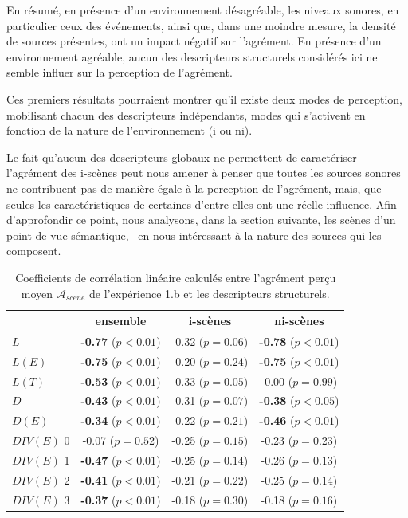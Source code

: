 En résumé, en présence d'un environnement désagréable, les niveaux sonores, en particulier ceux des événements, ainsi que, dans une moindre mesure, la densité de sources présentes, ont un impact négatif sur l'agrément. En présence d'un environnement agréable, aucun des descripteurs structurels considérés ici ne semble influer sur la perception de l'agrément. 

Ces premiers résultats pourraient montrer qu'il existe deux modes de perception, mobilisant chacun des descripteurs indépendants, modes qui s'activent en fonction de la nature de l'environnement (i ou ni).

Le fait qu'aucun des descripteurs globaux ne permettent de caractériser l'agrément des i-scènes peut nous amener à penser que toutes les sources sonores ne contribuent pas de manière égale à la perception de l'agrément, mais, que seules les caractéristiques de certaines d'entre elles ont une réelle influence. Afin d'approfondir ce point, nous analysons, dans la section suivante, les scènes d'un point de vue sémantique, \ie~en nous intéressant à la nature des sources qui les composent. \\


\begin{table}[t]
\centering
\begin{tabular}{l c c c} 
               & ensemble                     & i-scènes                   & ni-scènes    \\
\hline
$L$            & \textbf{-0.77} ($p<0.01$)    & -0.32 ($p=0.06$)           & \textbf{-0.78} ($p<0.01$)\\
$L(E)$         & \textbf{-0.75} ($p<0.01$)    & -0.20 ($p=0.24$)           & \textbf{-0.75} ($p<0.01$)\\
$L(T)$         & \textbf{-0.53} ($p<0.01$)    & -0.33 ($p=0.05$)           &  -0.00 ($p=0.99$) \\
$D$            & \textbf{-0.43} ($p<0.01$)    & -0.31 ($p=0.07$)           & \textbf{-0.38} ($p<0.05$)\\
$D(E)$         & \textbf{-0.34} ($p<0.01$)    & -0.22 ($p=0.21$)           & \textbf{-0.46} ($p<0.01$)\\
$DIV(E)$ 0     &          -0.07 ($p=0.52$)    & -0.25 ($p=0.15$)           & -0.23 ($p=0.23$)\\
$DIV(E)$ 1     & \textbf{-0.47} ($p<0.01$)    & -0.25 ($p=0.14$)           & -0.26 ($p=0.13$)\\
$DIV(E)$ 2     & \textbf{-0.41} ($p<0.01$)    & -0.21 ($p=0.22$)           & -0.25 ($p=0.14$)\\
$DIV(E)$ 3     & \textbf{-0.37} ($p<0.01$)    & -0.18 ($p=0.30$)           & -0.18 ($p=0.16$)\\
\hline
\end{tabular}
\vspace{0.5mm}
\caption{Coefficients de corrélation linéaire calculés entre l'agrément perçu moyen $\mathcal{A}_{scene}$ de l'expérience 1.b et les descripteurs structurels.}
\label{tab:corrStructA}
\end{table}

